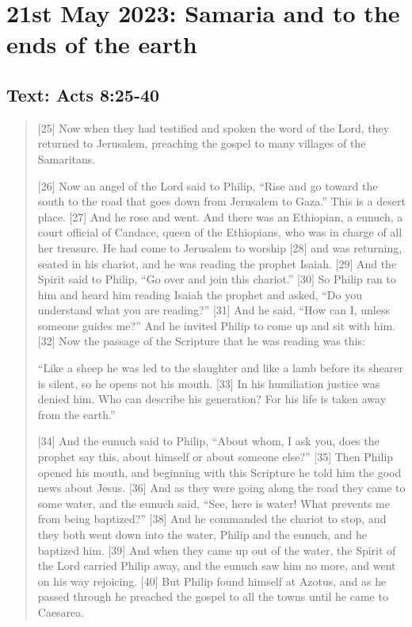 \setcounter{figure}{0}

\section{21st May 2023: Samaria and to the ends of the earth}
\subsection*{Text: Acts 8:25-40}
  \begin{quote}
    [25] Now when they had testified and spoken the word of the Lord, they
    returned to Jerusalem, preaching the gospel to many villages of the
    Samaritans.

    [26] Now an angel of the Lord said to Philip, “Rise and go toward the
    south to the road that goes down from Jerusalem to Gaza.” This is a
    desert place. [27] And he rose and went. And there was an Ethiopian, a
    eunuch, a court official of Candace, queen of the Ethiopians, who was in
    charge of all her treasure. He had come to Jerusalem to worship [28] and
    was returning, seated in his chariot, and he was reading the prophet
    Isaiah. [29] And the Spirit said to Philip, “Go over and join this
    chariot.” [30] So Philip ran to him and heard him reading Isaiah the
    prophet and asked, “Do you understand what you are reading?” [31] And he
    said, “How can I, unless someone guides me?” And he invited Philip to
    come up and sit with him. [32] Now the passage of the Scripture that he
    was reading was this:

    “Like a sheep he was led to the slaughter
        and like a lamb before its shearer is silent,
        so he opens not his mouth.
    [33] In his humiliation justice was denied him.
        Who can describe his generation?
    For his life is taken away from the earth.”


    [34] And the eunuch said to Philip, “About whom, I ask you, does the
    prophet say this, about himself or about someone else?” [35] Then Philip
    opened his mouth, and beginning with this Scripture he told him the good
    news about Jesus. [36] And as they were going along the road they came to
    some water, and the eunuch said, “See, here is water! What prevents me
    from being baptized?” [38] And he commanded the chariot to stop, and they
    both went down into the water, Philip and the eunuch, and he baptized
    him. [39] And when they came up out of the water, the Spirit of the Lord
    carried Philip away, and the eunuch saw him no more, and went on his way
    rejoicing. [40] But Philip found himself at Azotus, and as he passed
    through he preached the gospel to all the towns until he came to
    Caesarea.
  \end{quote}
